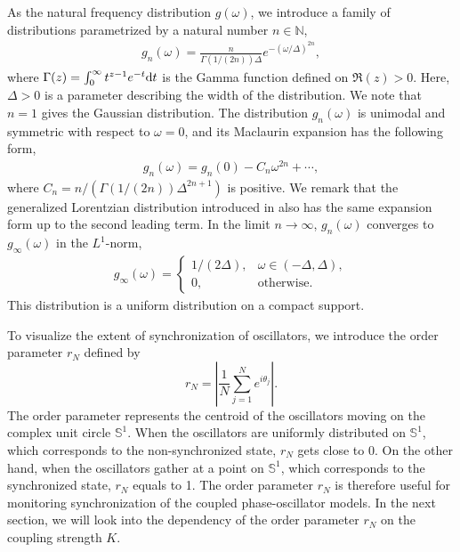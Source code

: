 As the natural frequency distribution $g(\omega)$,
we introduce a family of distributions
parametrized by a natural number $n\in\mathbb{N}$,
\begin{align}
  g_{n}(\omega)=\frac{n}{\Gamma(1/(2n))\Delta}e^{-(\omega/\Delta)^{2n}},
  \label{eq:g_n}
\end{align}
where $\Gamma(z)=\int_{0}^{\infty}t^{z-1}e^{-t}\mathrm{d} t$ is the Gamma function defined on $\Re(z)>0$.
Here, $\Delta>0$ is a parameter describing the width of the distribution. 
We note that $n=1$ gives the Gaussian distribution.
The distribution $g_{n}(\omega)$
is unimodal and symmetric with respect to $\omega=0$,
and its Maclaurin expansion has the following form,
\begin{align}
  g_{n}(\omega)=g_{n}(0)-C_{n}\omega^{2n}+\cdots,
  \label{eq:maclaurin}
\end{align}
where $C_{n}=n/(\Gamma(1/(2n))\Delta^{2n+1})$ is positive.
We remark that the generalized Lorentzian distribution introduced in \cite{pietras2018} also has the same expansion form
up to the second leading term.
In the limit $n\to\infty$, $g_{n}(\omega)$ converges to $g_{\infty}(\omega)$ in the $L^{1}$-norm,
\begin{align}
  g_{\infty}(\omega)=\left\{
  \begin{array}{ll}
    1/(2\Delta), & \omega\in(-\Delta,\Delta),\\
    0, & \mathrm{otherwise}.
  \end{array}
  \right.
\end{align}
This distribution is a uniform distribution on a compact support.

To visualize the extent of synchronization of oscillators,
we introduce the order parameter $r_{N}$ defined by
\begin{equation}
  \label{eq:order-parameter}
  r_{N}=\left|\frac{1}{N}\sum_{j=1}^{N}e^{i\theta_{j}}\right|.
\end{equation}
The order parameter represents the centroid of the oscillators moving on the complex unit circle $\mathbb{S}^{1}$.
When the oscillators are uniformly distributed on $\mathbb{S}^{1}$,
which corresponds to the non-synchronized state, $r_{N}$ gets close to 0.
On the other hand, when the oscillators gather at a point on $\mathbb{S}^{1}$,
which corresponds to the synchronized state, $r_{N}$ equals to 1.
The order parameter $r_{N}$ is therefore useful for monitoring synchronization of the coupled phase-oscillator models.
In the next section,
we will look into the dependency of the order parameter $r_{N}$
on the coupling strength $K$.

